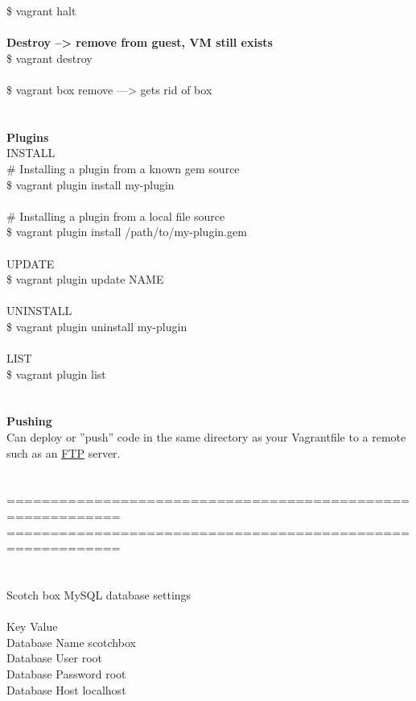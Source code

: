 \documentclass[10pt,a4paper]{article}
\begin{document}
{{{{{{{{{{{{{{{{{{{{{{{{{}\$ vagrant halt\textbf{\\
\\
Destroy --> remove from guest, VM still exists}\\
\$ vagrant destroy    \\
\\
\$ vagrant box remove       --->  gets rid of box\\
\\
\\
\textbf{Plugins}\\
INSTALL\\
\# Installing a plugin from a known gem source\\
\$ vagrant plugin install my-plugin\\
\\
\# Installing a plugin from a local file source\\
\$ vagrant plugin install /path/to/my-plugin.gem\\
\\
UPDATE\\
\$ vagrant plugin update NAME\\
\\
UNINSTALL\\
\$ vagrant plugin uninstall my-plugin\\
\\
LIST\\
\$ vagrant plugin list\\
\\
\\
\textbf{Pushing}\\
Can deploy or ''push'' code in the same directory as your Vagrantfile to a remote such as an \hyperlink{ftp}{FTP} server.\\
\\
\\
===========================================================\\
===========================================================\\
\\
\\
Scotch box MySQL database settings\\
\\
Key 						Value\\
Database Name 			scotchbox\\
Database User 			root\\
Database Password 		root\\
Database Host 			localhost\\
}}}}}}}}}}}}}}}}}}}}}}}}
\end{document}

